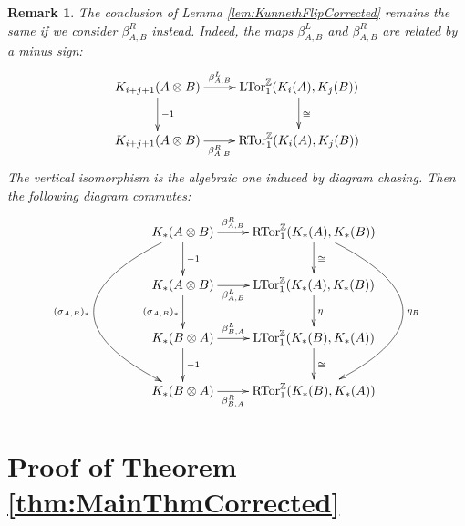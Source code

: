\documentclass[a4paper,10pt]{amsart}
\newcounter{theorem}
\newtheorem{remark}[theorem]{Remark}
\numberwithin{equation}{section}
\numberwithin{theorem}{section}
\newcommand{\LTor}{\mathrm{LTor}_1^{\mathbb Z}}
\newcommand{\RTor}{\mathrm{RTor}_1^{\mathbb Z}}
\begin{document}
\begin{remark}
    The conclusion of Lemma \ref{lem:KunnethFlipCorrected} remains the same if we consider $\beta_{A,B}^R$ instead. Indeed, the maps $\beta_{A,B}^L$ and $\beta_{A,B}^R$ are related by a minus sign:
    \[
        \xymatrix{
            K_{i+j+1}(A \otimes B) \ar[r]^-{\beta_{A,B}^L} \ar[d]^{-1} & \LTor(K_i(A),K_j(B)) \ar[d]^\cong  \\
            K_{i+j+1}(A \otimes B) \ar[r]_-{\beta_{A,B}^R} & \RTor(K_i(A),K_j(B))
        }
    \]
    The vertical isomorphism is the algebraic one induced by diagram chasing. Then the following diagram commutes: 
    \[
        \xymatrix{
             K_*(A \otimes B)  \ar@/_7em/[ddd]_{(\sigma_{A,B})_*} \ar[r]^-{\beta_{A,B}^R} \ar[d]^{-1} & \RTor(K_*(A),K_*(B)) \ar[d]^\cong \ar@/^7em/[ddd]^{\eta_R}  \\
            K_*(A \otimes B) \ar[r]_-{\beta_{A,B}^L} \ar[d]_{(\sigma_{A,B})_*} & \LTor(K_*(A),K_*(B)) \ar[d]^{ \eta} \\
             K_*(B \otimes A) \ar[r]^-{\beta_{B,A}^L} \ar[d]^{-1} & \LTor(K_*(B),K_*(A)) \ar[d]^\cong  \\
            K_*(B \otimes A) \ar[r]_-{\beta_{B,A}^R} & \RTor(K_*(B),K_*(A))
        }
    \]
\end{remark}

\section{Proof of Theorem \ref{thm:MainThmCorrected}}
\label{sec:MainThmCorrected}
\end{document}
